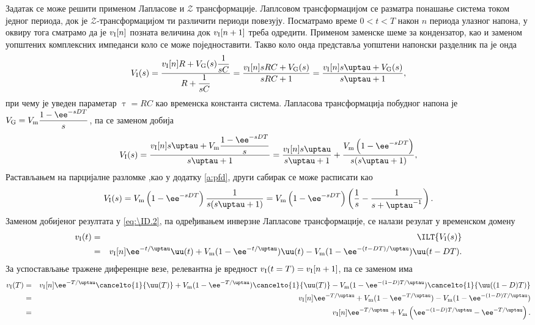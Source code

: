 Задатак се може решити применом Лапласове и $\mathcal{Z}$ трансформације. Лаплсовом трансформацијом се разматра понашање система током једног периода, 
док је $\mathcal{Z}$-трансформацијом ти различити периоди повезују. Посматрамо време $0 < t < T$ након $n$ периода улазног напона, у оквиру тога 
сматрамо да је $v_{\rm I}[n]$ позната величина док $v_{\rm I}[n+1]$ треба одредити. Применом заменске шеме за кондензатор, као и заменом уопштених 
комплексних импеданси коло се може поједноставити. Такво коло онда представља уопштени напонски разделник па је онда 
\begin{eqnarray}
    V_{\rm I}(s) = \dfrac{v_{\rm I}[n] R + V_{\rm G}(s) \dfrac{1}{sC}}{R + \dfrac{1}{sC}} = 
    \dfrac{v_{\rm I}[n] sRC + V_{\rm G}(s) }{sRC + 1} = \dfrac{v_{\rm I}[n] s \uptau + V_{\rm G}(s) }{s\uptau + 1},
\end{eqnarray}
при чему је уведен параметар $\uptau = RC$ као временска константа система. Лапласова трансформација побудног напона је 
$V_{\rm G} = V_{\rm m}\dfrac{1 - \ee^{-sDT}}{s}$, па се заменом добија 
\begin{eqnarray}
    V_{\rm I}(s) = \dfrac{v_{\rm I}[n] s \uptau + V_{\rm m}\dfrac{1 - \ee^{-sDT}}{s} }{s\uptau + 1} =
       \dfrac{v_{\rm I}[n] s \uptau }{s \uptau + 1} +
       \dfrac{V_{\rm m}\left(1 - \ee^{-sDT}\right) }{s(s\uptau + 1)}, \label{eq:\ID.2}
\end{eqnarray}
Растављањем на парцијалне разломке ,као у додатку \ref{a:pfd}, други сабирак се може расписати као  
\begin{eqnarray}
    V_{\rm I}(s) = 
    V_{\rm m} \left(1 - \ee^{-sDT}\right) \dfrac{ 1 }{s(s\uptau + 1)} 
    = 
    V_{\rm m} \left(1 - \ee^{-sDT}\right) \left(\dfrac{1}{s} - \dfrac{1}{s + \uptau^{-1}} \right).
\end{eqnarray}
Заменом добијеног резултата у \eqref{eq:\ID.2}, па одређивањем инверзне Лапласове трансформације, се налази резулат у временском домену
\begin{eqnarray}
    v_{\rm I}(t) &=& \ILT{V_{\rm I}(s)} \\
    &=& 
    v _{\rm I}[n] \ee^{-t/\uptau} \uu(t)
    +
    V_{\rm m}(1 - \ee^{-t/\uptau}) \uu(t)
    -
    V_{\rm m}(1 - \ee^{-(t-DT)/\uptau}) \uu(t-DT).
\end{eqnarray}
За успостављање тражене диференцне везе, релевантна је вредност $v_{\rm I}(t = T) = v_{\rm I}[n+1]$, па се заменом има
\begin{eqnarray}
    v_{\rm I}(T)
    &=&
    v _{\rm I}[n] \ee^{-T/\uptau} \cancelto{1}{\uu(T)}
    +
    V_{\rm m}(1 - \ee^{-T/\uptau}) \cancelto{1}{\uu(T)}
    -
    V_{\rm m}(1 - \ee^{-(1-D)T/\uptau}) \cancelto{1}{\uu((1-D)T)}
    \\
    &=&
    v _{\rm I}[n] \ee^{-T/\uptau}
    +
    V_{\rm m}(1 - \ee^{-T/\uptau})
    -
    V_{\rm m}(1 - \ee^{-(1-D)T/\uptau})
    \\ 
    &=&
    v _{\rm I}[n] \ee^{-T/\uptau}
    +
    V_{\rm m}
    \left(
         \ee^{-(1-D)T/\uptau} - \ee^{-T/\uptau}
    \right).
\end{eqnarray}

